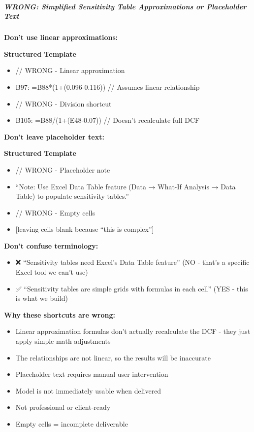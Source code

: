 \documentclass[11pt]{article}
\begin{document}
\subparagraph{WRONG: Simplified Sensitivity Table Approximations or Placeholder Text}\mbox{}\par

\textbf{Don't use linear approximations:}


\textbf{Structured Template}
\begin{itemize}[leftmargin=*,itemsep=2pt,topsep=2pt]
\item {} // WRONG - Linear approximation
\item {} B97: =B88*(1+(0.096-0.116)) // Assumes linear relationship
\item {} // WRONG - Division shortcut
\item {} B105: =B88/(1+(E48-0.07)) // Doesn't recalculate full DCF
\end{itemize}

\textbf{Don't leave placeholder text:}

\textbf{Structured Template}
\begin{itemize}[leftmargin=*,itemsep=2pt,topsep=2pt]
\item {} // WRONG - Placeholder note
\item {} ``Note: Use Excel Data Table feature (Data → What-If Analysis → Data Table) to populate sensitivity tables.''
\item {} // WRONG - Empty cells
\item {} [leaving cells blank because ``this is complex'']
\end{itemize}

\textbf{Don't confuse terminology:}

\begin{itemize}[leftmargin=*,itemsep=2pt,topsep=2pt]
\item {} ❌ ``Sensitivity tables need Excel's Data Table feature'' (NO - that's a specific Excel tool we can't use)
\item {} ✅ ``Sensitivity tables are simple grids with formulas in each cell'' (YES - this is what we build)
\end{itemize}

\textbf{Why these shortcuts are wrong:}

\begin{itemize}[leftmargin=*,itemsep=2pt,topsep=2pt]
\item {} Linear approximation formulas don't actually recalculate the DCF - they just apply simple math adjustments
\item {} The relationships are not linear, so the results will be inaccurate
\item {} Placeholder text requires manual user intervention
\item {} Model is not immediately usable when delivered
\item {} Not professional or client-ready
\item {} Empty cells = incomplete deliverable
\end{itemize}
\end{document}
